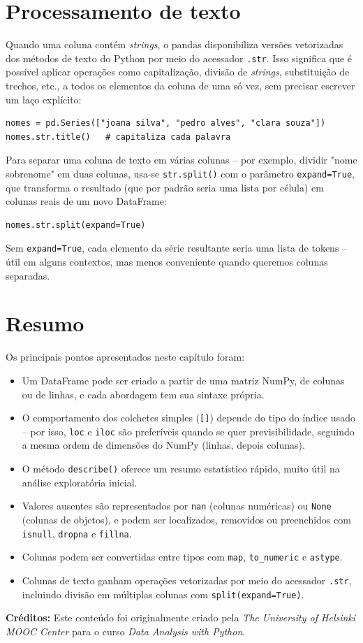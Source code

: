 \documentclass[11pt,a4paper]{article}
\begin{document}
\section{Processamento de texto}

Quando uma coluna contém \textit{strings}, o pandas disponibiliza versões vetorizadas dos métodos de texto do Python por meio do acessador \texttt{.str}. Isso significa que é possível aplicar operações como capitalização, divisão de \textit{strings}, substituição de trechos, etc., a todos os elementos da coluna de uma só vez, sem precisar escrever um laço explícito:
\begin{lstlisting}
nomes = pd.Series(["joana silva", "pedro alves", "clara souza"])
nomes.str.title()   # capitaliza cada palavra
\end{lstlisting}

Para separar uma coluna de texto em várias colunas -- por exemplo, dividir "nome sobrenome" em duas colunas, usa-se \texttt{str.split()} com o parâmetro \texttt{expand=True}, que transforma o resultado (que por padrão seria uma lista por célula) em colunas reais de um novo DataFrame:
\begin{lstlisting}
nomes.str.split(expand=True)
\end{lstlisting}

Sem \texttt{expand=True}, cada elemento da série resultante seria uma lista de tokens -- útil em alguns contextos, mas menos conveniente quando queremos colunas separadas.

\section{Resumo}

Os principais pontos apresentados neste capítulo foram:
\begin{itemize}
    \item Um DataFrame pode ser criado a partir de uma matriz NumPy, de colunas ou de linhas, e cada abordagem tem sua sintaxe própria.
    \item O comportamento dos colchetes simples (\texttt{[]}) depende do tipo do índice usado -- por isso, \texttt{loc} e \texttt{iloc} são preferíveis quando se quer previsibilidade, seguindo a mesma ordem de dimensões do NumPy (linhas, depois colunas).
    \item O método \texttt{describe()} oferece um resumo estatístico rápido, muito útil na análise exploratória inicial.
    \item Valores ausentes são representados por \texttt{nan} (colunas numéricas) ou \texttt{None} (colunas de objetos), e podem ser localizados, removidos ou preenchidos com \texttt{isnull}, \texttt{dropna} e \texttt{fillna}.
    \item Colunas podem ser convertidas entre tipos com \texttt{map}, \texttt{to\_numeric} e \texttt{astype}.
    \item Colunas de texto ganham operações vetorizadas por meio do acessador \texttt{.str}, incluindo divisão em múltiplas colunas com \texttt{split(expand=True)}.
\end{itemize}

\vspace{2em}
\noindent\textbf{Créditos:} Este conteúdo foi originalmente criado pela \textit{The University of Helsinki MOOC Center} para o curso \textit{Data Analysis with Python}.
\end{document}
